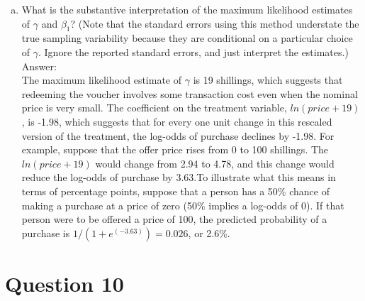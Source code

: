 \documentclass[11pt,notitlepage]{article}\usepackage[]{graphicx}\usepackage[]{color}
\makeatletter
\newenvironment{kframe}{%
 \def\at@end@of@kframe{}%
 \ifinner\ifhmode%
  \def\at@end@of@kframe{\end{minipage}}%
  \begin{minipage}{\columnwidth}%
 \fi\fi%
 \def\FrameCommand##1{\hskip\@totalleftmargin \hskip-\fboxsep
 \colorbox{shadecolor}{##1}\hskip-\fboxsep
     \hskip-\linewidth \hskip-\@totalleftmargin \hskip\columnwidth}%
 \MakeFramed {\advance\hsize-\width
   \@totalleftmargin\z@ \linewidth\hsize
   \@setminipage}}%
 {\par\unskip\endMakeFramed%
 \at@end@of@kframe}
\newenvironment{knitrout}{}{} %
\makeatother
\begin{document}
\begin{enumerate}[a)]
\begin{knitrout}
{}



\end{knitrout}


\item What is the substantive interpretation of the maximum likelihood estimates of $\gamma$ and $\beta_1$? (Note that the standard errors using this method understate the true sampling variability because they are conditional on a particular choice of $\gamma$. Ignore the reported standard errors, and just interpret the estimates.)\\
Answer:\\
The maximum likelihood estimate of $\gamma$ is 19 shillings, which suggests that redeeming the voucher involves some transaction cost even when the nominal price is very small.  The coefficient on the treatment variable, $ln(price+19)$, is -1.98, which suggests that for every one unit change in this rescaled version of the treatment, the log-odds of purchase declines by -1.98.  For example, suppose that the offer price rises from 0 to 100 shillings.  The $ln(price+19)$ would change from 2.94 to 4.78, and this change would reduce the log-odds of purchase by 3.63.To illustrate what this means in terms of percentage points, suppose that a person has a 50\% chance of making a purchase at a price of zero (50\% implies a log-odds of 0). If that person were to be offered a price of 100, the predicted probability of a purchase is $1/(1+e^(-3.63) )=0.026$, or 2.6\%. 


\end{enumerate}
\section*{Question 10}
\begin{knitrout}
\color{fgcolor}\begin{kframe}
\begin{verbatim}






\end{verbatim}
\end{kframe}
\end{knitrout}
\end{document}
